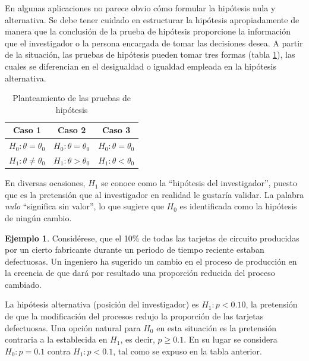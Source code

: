 \documentclass[
  11pt,
]{book}
\theoremstyle{definition}
\theoremstyle{definition}
\newtheorem{example}{Ejemplo}[chapter]
\theoremstyle{definition}
\theoremstyle{definition}
\theoremstyle{remark}
\begin{document}
En algunas aplicaciones no parece obvio cómo formular la hipótesis nula y alternativa. Se debe tener cuidado en estructurar la hipótesis apropiadamente de manera que la conclusión de la prueba de hipótesis proporcione la información que el investigador o la persona encargada de tomar las decisiones desea. A partir de la situación, las pruebas de hipótesis pueden tomar tres formas (tabla \ref{tab:hipotesis}), las cuales se diferencian en el desigualdad o igualdad empleada en la hipótesis alternativa.

\begin{table}[H]
\centering
\caption{\label{tab:hipotesis}Planteamiento de las pruebas de hipótesis}
\centering
\begin{tabular}[t]{ccc}
\toprule
Caso 1 & Caso 2 & Caso 3\\
\midrule
$H_0: \theta = \theta_0$ & $H_0: \theta = \theta_0$ & $H_0: \theta = \theta_0$\\
$H_1: \theta \neq \theta_0$ & $H_1: \theta > \theta_0$ & $H_1:\theta < \theta_0$\\
\bottomrule
\end{tabular}
\end{table}

En diversas ocasiones, \(H_1\) se conoce como la ``hipótesis del investigador'', puesto que es la pretensión que al investigador en realidad le gustaría validar. La palabra \emph{nulo} ``significa sin valor'', lo que sugiere que \(H_0\) es identificada como la hipótesis de ningún cambio.

\begin{example}
Considérese, que el 10\% de todas las tarjetas de circuito producidas por un cierto fabricante durante un periodo de tiempo reciente estaban defectuosas. Un ingeniero ha sugerido un cambio en el proceso de producción en la creencia de que dará por resultado una proporción reducida del proceso cambiado.

La hipótesis alternativa (posición del investigador) es \(H_1: p <0.10\), la pretensión de que la modificación del procesos redujo la proporción de las tarjetas defectuosas. Una opción natural para \(H_0\) en esta situación es la pretensión contraria a la establecida en \(H_1\), es decir, \(p\geq 0.1\). En su lugar se considera \(H_0: p = 0.1\) contra \(H_1: p < 0.1\), tal como se expuso en la tabla anterior.
\end{example}
\end{document}
